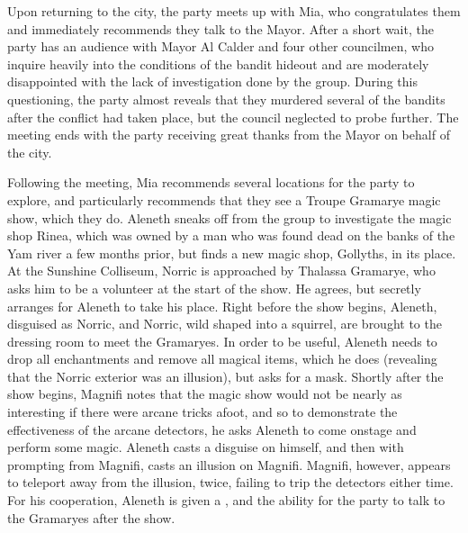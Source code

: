 Upon returning to the city, the party meets up with Mia, who congratulates them and immediately recommends they talk to the Mayor. After a short wait, the party has an audience with Mayor Al Calder and four other councilmen, who inquire heavily into the conditions of the bandit hideout and are moderately disappointed with the lack of investigation done by the group. During this questioning, the party almost reveals that they murdered several of the bandits after the conflict had taken place, but the council neglected to probe further. The meeting ends with the party receiving great thanks from the Mayor on behalf of the city.

Following the meeting, Mia recommends several locations for the party to explore, and particularly recommends that they see a Troupe Gramarye magic show, which they do. Aleneth sneaks off from the group to investigate the magic shop Rinea, which was owned by a man who was found dead on the banks of the Yam river a few months prior, but finds a new magic shop, Gollyths, in its place. At the Sunshine Colliseum, Norric is approached by Thalassa Gramarye, who asks him to be a volunteer at the start of the show. He agrees, but secretly arranges for Aleneth to take his place. Right before the show begins, Aleneth, disguised as Norric, and Norric, wild shaped into a squirrel, are brought to the dressing room to meet the Gramaryes. In order to be useful, Aleneth needs to drop all enchantments and remove all magical items, which he does (revealing that the Norric exterior was an illusion), but asks for a mask. Shortly after the show begins, Magnifi notes that the magic show would not be nearly as interesting if there were arcane tricks afoot, and so to demonstrate the effectiveness of the arcane detectors, he asks Aleneth to come onstage and perform some magic. Aleneth casts a disguise on himself, and then with prompting from Magnifi, casts an illusion on Magnifi. Magnifi, however, appears to teleport away from the illusion, twice, failing to trip the detectors either time. For his cooperation, Aleneth is given a , and the ability for the party to talk to the Gramaryes after the show.

